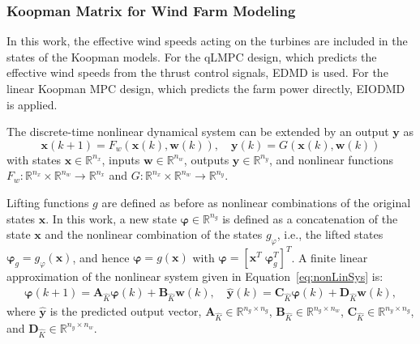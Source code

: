 \subsubsection{Koopman Matrix for Wind Farm Modeling}\label{KoopmanIdentification}

In this work, the effective wind speeds acting on the turbines are included in the states of the Koopman models. For the qLMPC design, which predicts the effective wind speeds from the thrust control signals, EDMD is used. For the linear Koopman MPC design, which predicts the farm power directly, EIODMD is applied.

The discrete-time nonlinear dynamical system can be extended by an output $\bm{y}$ as
\begin{equation}
    \bm{x}(k+1) = F_w(\bm{x}(k), \bm{w}(k)), \quad 
    \bm{y}(k) = G(\bm{x}(k), \bm{w}(k)) \label{eq:nonLinSys}
\end{equation}
with states $\bm{x} \in \mathbb{R}^{n_{x}}$, inputs $\bm{w} \in \mathbb{R}^{n_{w}}$, outputs $\bm{y} \in \mathbb{R}^{n_{y}}$, and nonlinear functions $F_w : \mathbb{R}^{n_{x}} \times \mathbb{R}^{n_{w}} \to \mathbb{R}^{n_{x}}$ and $G : \mathbb{R}^{n_{x}} \times \mathbb{R}^{n_{w}} \to \mathbb{R}^{n_{y}}$.


Lifting functions $g$ are defined as before as nonlinear combinations of the original states $\bm{x}$. In this work, a new state $\bm{\varphi}\in\mathbb{R}^{n_{g}}$ is defined as a concatenation of the state $\bm{x}$ and the nonlinear combination of the states $g_{\varphi}$, i.e., the lifted states $\bm{\varphi}_g = g_{\varphi}(\bm{x})$, and hence $ \bm{\varphi} = g(\bm{x})$ with $\bm{\varphi} = [\bm{x}^T \; \bm{\varphi}_g^T]^T$.
%
A finite linear approximation of the nonlinear system given in Equation~\eqref{eq:nonLinSys} is:
\begin{align*}
    \bm{\varphi}(k+1)=\bm{A}_{\hat{K}}\bm{\varphi}(k)+\bm{B}_{\hat{K}}\bm{w}(k), \quad 
    \hat{\bm{y}}(k) = \bm{C}_{\hat{K}}\bm{\varphi}(k) + \bm{D}_{\hat{K}}\bm{w}(k),%
\end{align*}
where $\hat{\bm{y}}$ is the predicted output vector, $\bm{A}_{\hat{K}}\in \mathbb{R}^{{n_g}\times {n_g}}$, $\bm{B}_{\hat{K}}\in \mathbb{R}^{n_g\times n_w}$, $\bm{C}_{\hat{K}}\in \mathbb{R}^{n_y\times n_g}$, and $\bm{D}_{\hat{K}}\in \mathbb{R}^{n_y\times n_w}$.

